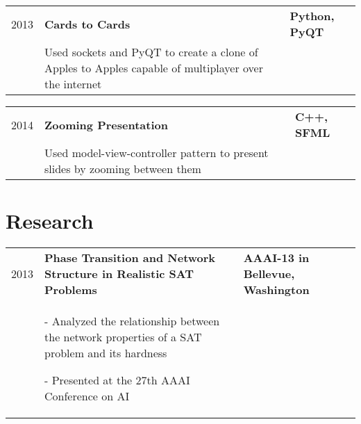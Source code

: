 \documentclass[letterpaper,10pt]{article}
\begin{document}
\begin{minipage}[t][0em][t]{0.8\textwidth}
\begin{tabular}{p{} p{} p{}}
  {2013} & \textbf{Cards to Cards} & \textbf{\small Python, PyQT}\\
  & {Used sockets and PyQT to create a clone of Apples to Apples capable of multiplayer over the internet} & \\
\end{tabular}

\begin{tabular}{p{} p{} p{}}
  
  {2014} & \textbf{Zooming Presentation} & \textbf{\small C++, SFML}\\
  & {Used model-view-controller pattern to present slides by zooming between them} & \\
\end{tabular}



  


\section*{\huge Research}
\begin{tabular}{p{} p{} p{}}
  
  {2013} & \textbf{Phase Transition and Network Structure in Realistic SAT Problems} & \textbf{\small AAAI-13 in Bellevue, Washington}\\
  & {- Analyzed the relationship between the network properties of a SAT problem and its hardness

- Presented at the 27th AAAI Conference on AI} & \\
\end{tabular}

%   


  


\end{minipage}\hspace{0.5cm}
\end{document}

